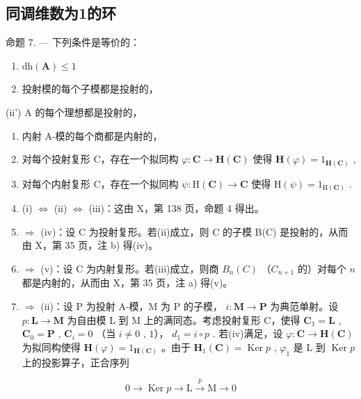 \subsection{同调维数为1的环}

命题 7. --- 下列条件是等价的：

\begin{enumerate}
\def\labelenumi{(\roman{enumi})}
\item
  \(\mathrm{dh}(\mathbf{A})\leqslant 1\)
\item
  投射模的每个子模都是投射的，
\end{enumerate}

(ii') A 的每个理想都是投射的，

\begin{enumerate}
\def\labelenumi{(\roman{enumi})}
\setcounter{enumi}{2}
\item
  内射 A-模的每个商都是内射的，
\item
  对每个投射复形 C，存在一个拟同构 \(\varphi : \mathbf{C} \to \mathbf{H}(\mathbf{C})\) 使得 \(\mathbf{H}(\varphi) = 1_{\mathbf{H}(\mathbf{C})}\) ,
\item
  对每个内射复形 C，存在一个拟同构 \(\psi : \mathrm{H}(\mathbf{C}) \to \mathbf{C}\) 使得 \(\mathrm{H}(\psi) = 1_{\mathrm{H}(\mathbf{C})}\) .
\item
  (i) \(\Leftrightarrow\) (ii) \(\Leftrightarrow\) (iii)：这由 X，第 138 页，命题 4 得出。
\item
  \(\Rightarrow\) (iv)：设 C 为投射复形。若(ii)成立，则 C 的子模 B(C) 是投射的，从而由 X，第 35 页，注 b) 得(iv)。
\item
  \(\Rightarrow\) (v)：设 C 为内射复形。若(iii)成立，则商 \(B_{n}(C)\) （\(C_{n+1}\) 的）对每个 \(n\) 都是内射的，从而由 X，第 35 页，注 a) 得(v)。
\item
  \(\Rightarrow\) (ii)：设 P 为投射 A-模，M 为 P 的子模， \(i: \mathbf{M} \to \mathbf{P}\) 为典范单射。设 \(p: \mathbf{L} \to \mathbf{M}\) 为自由模 L 到 M 上的满同态。考虑投射复形 C，使得 \(\mathbf{C}_1 = \mathbf{L}\) , \(\mathbf{C}_0 = \mathbf{P}\) , \(\mathbf{C}_i = 0\) （当 \(i \neq 0\) , \(1\)）， \(d_1 = i \circ p\) . 若(iv)满足，设 \(\varphi: \mathbf{C} \to \mathbf{H}(\mathbf{C})\) 为拟同构使得 \(\mathbf{H}(\varphi) = 1_{\mathbf{H}(\mathbf{C})}\) 。由于 \(\mathbf{H}_1(\mathbf{C}) = \operatorname{Ker} p\) , \(\varphi_1\) 是 L 到 \(\operatorname{Ker} p\) 上的投影算子，正合序列
\end{enumerate}

\[
0 \rightarrow \operatorname{Ker} p \rightarrow \mathrm{L} \xrightarrow {p} \mathrm{M} \rightarrow 0
\]

